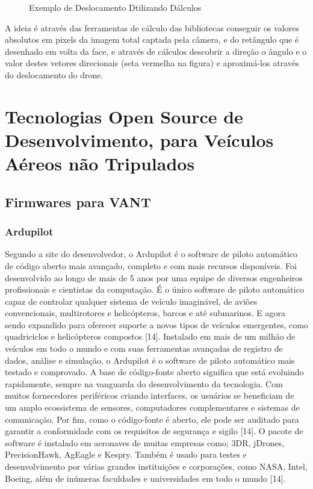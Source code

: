 \begin{figure}[H]
	\centering
	\caption{Exemplo de Deslocamento Dtilizando Dálculos}
	\fontsize{9pt}{12pt}\selectfont
	\color{black}
	\def\svgwidth{15cm}
	
	\label{fig:desl}
\end{figure}

A ideia é através das ferramentas de cálculo das bibliotecas conseguir os valores absolutos em pixels da imagem total captada pela câmera, e do retângulo que é desenhado em volta da face, e através de cálculos descobrir a direção o ângulo e o valor destes vetores direcionais (seta vermelha na figura) e aproximá-los através do deslocamento do drone.

\section{Tecnologias Open Source de Desenvolvimento, para Veículos Aéreos não Tripulados}

\subsection{Firmwares para VANT}

\subsubsection{Ardupilot}
Segundo a site do desenvolvedor, o Ardupilot é o software de piloto automático de código aberto mais avançado, completo e com mais recursos disponíveis. Foi desenvolvido ao longo de mais de 5 anos por uma equipe de diversos engenheiros profissionais e cientistas da computação. É o único software de piloto automático capaz de controlar qualquer sistema de veículo imaginável, de aviões convencionais, multirotores e helicópteros, barcos e até submarinos. E agora sendo expandido para oferecer suporte a novos tipos de veículos emergentes, como quadriciclos e helicópteros compostos [14].
Instalado em mais de um milhão de veículos em todo o mundo e com suas ferramentas avançadas de registro de dados, análise e simulação, o Ardupilot é o software de piloto automático mais testado e comprovado. A base de código-fonte aberto significa que está evoluindo rapidamente, sempre na vanguarda do desenvolvimento da tecnologia. Com muitos fornecedores periféricos criando interfaces, os usuários se beneficiam de um amplo ecossistema de sensores, computadores complementares e sistemas de comunicação. Por fim, como o código-fonte é aberto, ele pode ser auditado para garantir a conformidade com os requisitos de segurança e sigilo [14].
O pacote de software é instalado em aeronaves de muitas empresas como; 3DR, jDrones, PrecisionHawk, AgEagle e Kespry. Também é usado para testes e desenvolvimento por várias grandes instituições e corporações, como NASA, Intel, Boeing, além de inúmeras faculdades e universidades em todo o mundo [14].

